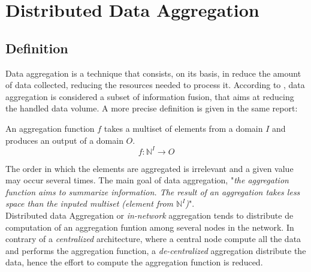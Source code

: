 \chapter{Distributed Data Aggregation}\label{chap:dda}
\section{Definition}
Data aggregation is a technique that consists, on its basis, in reduce the amount of data collected, reducing the resources needed to process it.  According to \cite{journals/corr/abs-1110-0725}, data aggregation is  considered a subset of information fusion, that aims at reducing the handled data volume. A more precise definition is given in the same report:
\begin{definition} An aggregation function $f$ takes a multiset of elements from a domain $I$ and produces an output of a domain $O$.
\begin{equation*} f : \mathbb{N}^I \to O \end{equation*}
\end{definition}
The order in which the elements are aggregated is irrelevant and a given value may occur several times.
The main goal of data aggregation, "\textit{the aggregation function aims to summarize information. The result of an aggregation takes less space than the inputed multiset (element from $\mathbb{N}^I$)}".\\
Distributed data Aggregation or \textit{in-network} aggregation tends to distribute de computation of an aggregation funtion among several nodes in the network. In contrary of a \textit{centralized} architecture, where a central node compute all the data and performs the aggregation function, a \textit{de-centralized} aggregation distribute the data, hence the effort to compute the aggregation function is reduced.
